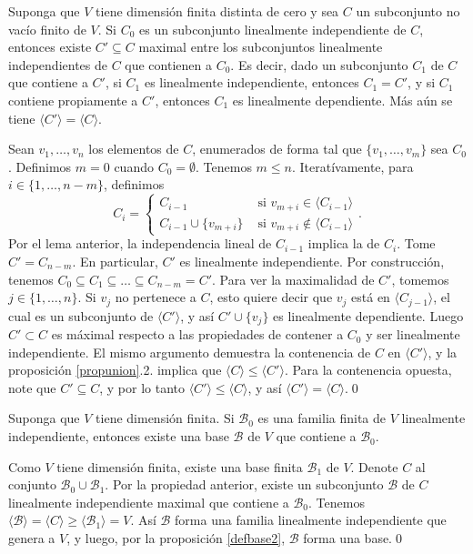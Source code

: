 \begin{prop}\label{maximallinind}
Suponga que $V$ tiene dimensi\'on finita distinta de cero y sea $C$ un subconjunto no vacío finito de $V$. Si $C_0$ es un subconjunto linealmente independiente de $C$, entonces existe $C'\subseteq C$ maximal entre los subconjuntos linealmente independientes de $C$ que contienen a $C_0$. Es decir, dado un subconjunto $C_1$ de $C$ que contiene a $C'$, si $C_1$ es linealmente independiente, entonces $C_1=C'$, y si $C_1$ contiene propiamente a $C'$, entonces $C_1$ es linealmente dependiente. M\'as a\'un se tiene $\langle C'\rangle=\langle C\rangle$.  
\end{prop}

\dem Sean $v_1,\ldots,v_n$ los elementos de $C$, enumerados de forma tal que $\{v_1,\ldots,v_m\}$ sea $C_0$. Definimos $m=0$ cuando $C_0=\emptyset$. Tenemos $m\le n$. Iteratívamente, para $i\in\{1,\ldots,n-m\}$, definimos
$$
C_i = \left\{ \begin{array}{rl}
C_{i-1}&\textrm{ si } v_{m+i}\in\langle C_{i-1}\rangle\\
C_{i-1}\cup\{v_{m+i}\} &\textrm{ si } v_{m+i}\not\in\langle C_{i-1}\rangle
\end{array}\right. .
$$
Por el lema anterior, la independencia lineal de $C_{i-1}$ implica la de $C_i$. Tome $C'=C_{n-m}$. En particular, $C'$ es linealmente independiente. Por construcci\'on, tenemos $C_0\subseteq C_1\subseteq\ldots\subseteq C_{n-m}= C'$. Para ver la maximalidad de $C'$, tomemos $j\in\{1,\ldots,n\}$. Si $v_j$ no pertenece a $C$, esto quiere decir que $v_j$ est\'a en $\langle C_{j-1}\rangle$, el cual es un subconjunto de $\langle C'\rangle$, y as\'i $C'\cup\{v_j\}$ es linealmente dependiente. Luego $C'\subset C$ es m\'aximal respecto a las propiedades de contener a $C_0$ y ser linealmente independiente. El mismo argumento demuestra la contenencia de $C$ en $\langle C'\rangle$, y la proposici\'on \ref{propunion}.2. implica que $\langle C\rangle\le\langle C'\rangle$. Para la contenencia opuesta, note que $C'\subseteq C$, y por lo tanto $\langle C'\rangle\le\langle C\rangle$, y así $\langle C'\rangle=\langle C\rangle$.\qed

\begin{teo}\label{extabase}
Suponga que $V$ tiene dimensi\'on finita. Si $\mathcal{B}_0$ es una familia finita de $V$ linealmente independiente, entonces existe una base $\mathcal{B}$ de $V$ que contiene a $\mathcal{B}_0$.
\end{teo}

\dem Como $V$ tiene dimensi\'on finita, existe una base finita $\mathcal{B}_1$ de $V$. Denote $C$ al conjunto $\mathcal{B}_0\cup \mathcal{B}_1$. Por la propiedad anterior, existe un subconjunto $\mathcal{B}$ de $C$ linealmente independiente maximal que contiene a $\mathcal{B}_0$. Tenemos $\langle \mathcal{B}\rangle=\langle C \rangle\ge\langle \mathcal{B}_1\rangle=V$. As\'i $\mathcal{B}$ forma una familia linealmente independiente que genera a $V$, y luego, por la proposici\'on \ref{defbase2}, $\mathcal{B}$ forma una base.\qed

